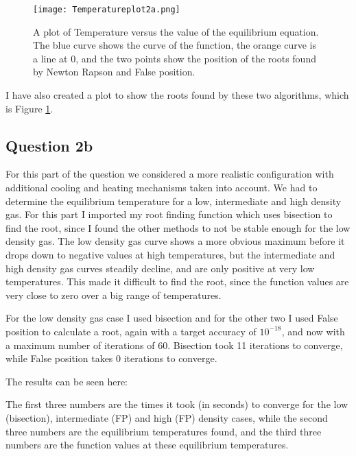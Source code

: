 \begin{figure}[ht!]
  \centering
  \texttt{[image: Temperatureplot2a.png]}
  \caption{A plot of Temperature versus the value of the equilibrium equation. The blue curve shows the curve of the function, the orange curve is a line at 0, and the two points show the position of the roots found by Newton Rapson and False position.}
  \label{fig:Temp}
\end{figure}

I have also created a plot to show the roots found by these two algorithms, which is Figure \ref{fig:Temp}.

\subsection{Question 2b}

For this part of the question we considered a more realistic configuration with additional cooling and heating mechanisms taken into account.
We had to determine the equilibrium temperature for a low, intermediate and high density gas. 
For this part I imported my root finding function which uses bisection to find the root, since I found the other methods to not be stable enough for the low density gas.
The low density gas curve shows a more obvious maximum before it drops down to negative values at high temperatures, but the intermediate and high density gas curves steadily decline, and are only positive at very low temperatures.
This made it difficult to find the root, since the function values are very close to zero over a big range of temperatures.

For the low density gas case I used bisection and for the other two I used False position to calculate a root, again with a target accuracy of $10^{-18}$, and now with a maximum number of iterations of 60.
Bisection took 11 iterations to converge, while False position takes 0 iterations to converge.

The results can be seen here:



The first three numbers are the times it took (in seconds) to converge for the low (bisection), intermediate (FP) and high (FP) density cases, while the second three numbers are the equilibrium temperatures found, and the third three numbers are the function values at these equilibrium temperatures.







